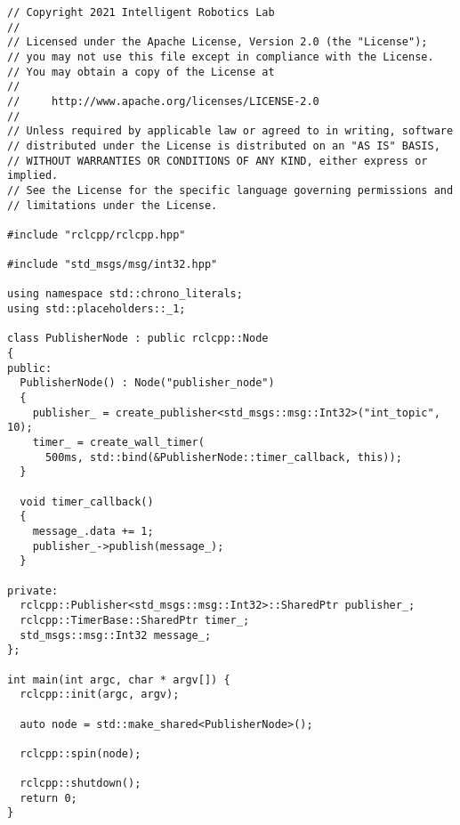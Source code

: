  \footnotesize
\begin{tcolorbox}[sharp corners, colframe=gray!80, colback=LightGray, left=0pt, top=0pt, bottom=0pt, title=\texttt{br2\_basics/src/publisher\_class.cpp}]
  \begin{verbatim}
// Copyright 2021 Intelligent Robotics Lab
//
// Licensed under the Apache License, Version 2.0 (the "License");
// you may not use this file except in compliance with the License.
// You may obtain a copy of the License at
//
//     http://www.apache.org/licenses/LICENSE-2.0
//
// Unless required by applicable law or agreed to in writing, software
// distributed under the License is distributed on an "AS IS" BASIS,
// WITHOUT WARRANTIES OR CONDITIONS OF ANY KIND, either express or implied.
// See the License for the specific language governing permissions and
// limitations under the License.

#include "rclcpp/rclcpp.hpp"  

#include "std_msgs/msg/int32.hpp"

using namespace std::chrono_literals;
using std::placeholders::_1;

class PublisherNode : public rclcpp::Node
{
public:
  PublisherNode() : Node("publisher_node")
  {
    publisher_ = create_publisher<std_msgs::msg::Int32>("int_topic", 10);
    timer_ = create_wall_timer(
      500ms, std::bind(&PublisherNode::timer_callback, this));
  }

  void timer_callback()
  {
    message_.data += 1;
    publisher_->publish(message_);
  }

private:
  rclcpp::Publisher<std_msgs::msg::Int32>::SharedPtr publisher_;
  rclcpp::TimerBase::SharedPtr timer_;
  std_msgs::msg::Int32 message_;
};

int main(int argc, char * argv[]) { 
  rclcpp::init(argc, argv);  

  auto node = std::make_shared<PublisherNode>();

  rclcpp::spin(node);

  rclcpp::shutdown();  
  return 0;  
}    \end{verbatim}
    \end{tcolorbox}
  \normalsize

